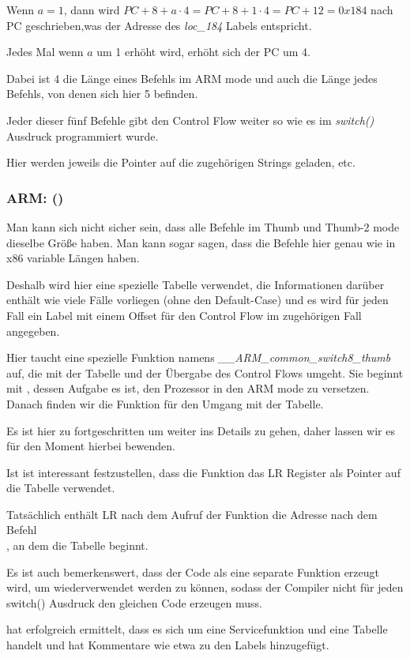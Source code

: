 Wenn $a=1$, dann wird $PC+8+a\cdot 4 = PC+8+1\cdot 4 = PC+12 = 0x184$ nach \ac{PC} geschrieben,was der Adresse des
\emph{loc\_184} Labels entspricht.

Jedes Mal wenn $a$ um 1 erhöht wird, erhöht sich der \ac{PC} um 4.

Dabei ist 4 die Länge eines Befehls im ARM mode und auch die Länge jedes  Befehls, von denen sich hier 5 befinden.

Jeder dieser fünf  Befehle gibt den Control Flow weiter so wie es im \emph{switch()} Ausdruck programmiert wurde.

Hier werden jeweils die Pointer auf die zugehörigen Strings geladen, etc.

\subsubsection{ARM: \OptimizingKeilVI (\ThumbMode)}



Man kann sich nicht sicher sein, dass alle Befehle im Thumb und Thumb-2 mode dieselbe Größe haben.
Man kann sogar sagen, dass die Befehle hier genau wie in x86 variable Längen haben.

Deshalb wird hier eine spezielle Tabelle verwendet, die Informationen darüber enthält wie viele Fälle vorliegen (ohne
den Default-Case) und es wird für jeden Fall ein Label mit einem Offset für den Control Flow im zugehörigen Fall
angegeben.


Hier taucht eine spezielle Funktion namens \emph{\_\_ARM\_common\_switch8\_thumb} auf, die mit der Tabelle und der
Übergabe des Control Flows umgeht.
Sie beginnt mit , dessen Aufgabe es ist, den Prozessor in den ARM mode zu versetzen.
Danach finden wir die Funktion für den Umgang mit der Tabelle.

Es ist hier zu fortgeschritten um weiter ins Details zu gehen, daher lassen wir es für den Moment hierbei bewenden. 


Ist ist interessant festzustellen, dass die Funktion das \ac{LR} Register als Pointer auf die Tabelle verwendet.

Tatsächlich enthält \ac{LR} nach dem Aufruf der Funktion die Adresse nach dem Befehl\\
, an dem die Tabelle beginnt.

Es ist auch bemerkenswert, dass der Code als eine separate Funktion erzeugt wird, um wiederverwendet werden zu können,
sodass der Compiler nicht für jeden switch() Ausdruck den gleichen Code erzeugen muss.

\IDA hat erfolgreich ermittelt, dass es sich um eine Servicefunktion und eine Tabelle handelt und hat Kommentare wie
etwa  zu den Labels hinzugefügt.


